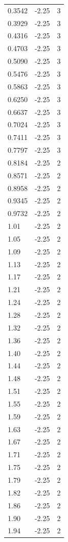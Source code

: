\begin{longtable}{lrr}
  0.3542 & -2.25 & 3 \\
  0.3929 & -2.25 & 3 \\
  0.4316 & -2.25 & 3 \\
  0.4703 & -2.25 & 3 \\
  0.5090 & -2.25 & 3 \\
  0.5476 & -2.25 & 3 \\
  0.5863 & -2.25 & 3 \\
  0.6250 & -2.25 & 3 \\
  0.6637 & -2.25 & 3 \\
  0.7024 & -2.25 & 3 \\
  0.7411 & -2.25 & 3 \\
  0.7797 & -2.25 & 3 \\
  0.8184 & -2.25 & 2 \\
  0.8571 & -2.25 & 2 \\
  0.8958 & -2.25 & 2 \\
  0.9345 & -2.25 & 2 \\
  0.9732 & -2.25 & 2 \\
  1.01 & -2.25 & 2 \\
  1.05 & -2.25 & 2 \\
  1.09 & -2.25 & 2 \\
  1.13 & -2.25 & 2 \\
  1.17 & -2.25 & 2 \\
  1.21 & -2.25 & 2 \\
  1.24 & -2.25 & 2 \\
  1.28 & -2.25 & 2 \\
  1.32 & -2.25 & 2 \\
  1.36 & -2.25 & 2 \\
  1.40 & -2.25 & 2 \\
  1.44 & -2.25 & 2 \\
  1.48 & -2.25 & 2 \\
  1.51 & -2.25 & 2 \\
  1.55 & -2.25 & 2 \\
  1.59 & -2.25 & 2 \\
  1.63 & -2.25 & 2 \\
  1.67 & -2.25 & 2 \\
  1.71 & -2.25 & 2 \\
  1.75 & -2.25 & 2 \\
  1.79 & -2.25 & 2 \\
  1.82 & -2.25 & 2 \\
  1.86 & -2.25 & 2 \\
  1.90 & -2.25 & 2 \\
  1.94 & -2.25 & 2 \\

\end{longtable}
